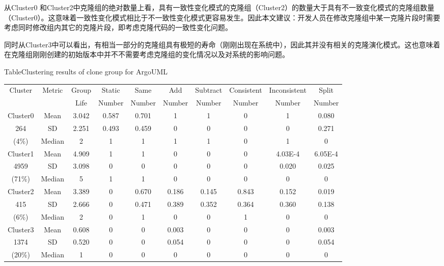 从Cluster0 和Cluster2中克隆组的绝对数量上看，具有一致性变化模式的克隆组（Cluster2）的数量大于具有不一致变化模式的克隆组数量（Cluster0）。这意味着一致性变化模式相比于不一致性变化模式更容易发生。因此本文建议：开发人员在修改克隆组中某一克隆片段时需要考虑同时修改组内其它的克隆片段，即考虑克隆代码的一致性变化问题。

同时从Cluster3中可以看出，有相当一部分的克隆组具有极短的寿命（刚刚出现在系统中），因此其并没有相关的克隆演化模式。这也意味着在克隆组刚刚创建的初始版本中并不不需要考虑克隆组的变化情况以及对系统的影响问题。


\begin{table}[htbp]
{Table$\!$}{Clustering results of clone group for ArgoUML}
\vspace{0.5em}
\centering
\footnotesize
\begin{tabular}{cccccccccc}
\toprule[1.5pt]
\multirow{2}{*}{Cluster}&\multirow{2}{*}{Metric}&Group&Static &Same &Add &Subtract &Consistent &	Inconsistent &Split \\ 
&&Life& Number& Number& Number& Number& Number&	 Number& Number\\ 
\midrule[1pt]
Cluster0&Mean&	3.042	&0.587	&0.701	&1	&1	&0	&1	&0.080\\ 
264&SD&2.251	&0.493	&0.459	&0	&0	&0	&0	&0.271\\ 
(4\%)&Median	&2	&1	&1	&1  &1	&0	&1	&0\\ 
\hline
Cluster1&Mean	&4.909&1	&1	&0	&0	&0	&4.03E-4	&6.05E-4\\ 
4959&SD&3.098&0	&0	&0	&0	&0	&0.020&0.025\\ 
(71\%)&Median	&5	&1	&1	&0	&0	&0	&0	&0\\ 
\hline
Cluster2&Mean	&3.389&0	&0.670&0.186&0.145&0.843	&0.152&0.019\\ 
415&SD&2.666&0	&0.471&0.389&0.352&0.364	&0.360&0.138\\ 
(6\%)&Median	&2	&0	&1	&0	&0	&1	&0	&0\\ 
\hline
Cluster3&Mean	&0.608&0	&0	&0.003&0	&0	&0	&0.003\\ 
1374&SD&0.520&0	&0	&0.054&0	&0	&0	&0.054\\ 
(20\%)&Median	&1	&0	&0	&0	&0	&0	&0	&0\\
\bottomrule[1.5pt]
\end{tabular}
\end{table}

